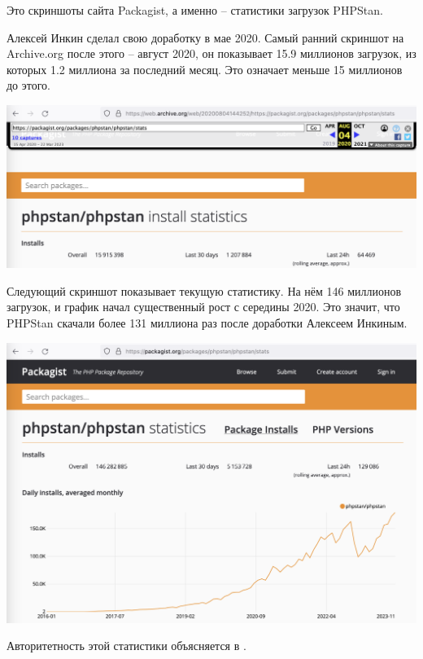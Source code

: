 
Это скриншоты сайта Packagist, а именно -- статистики загрузок PHPStan.

Алексей Инкин сделал свою доработку в мае 2020.
Самый ранний скриншот на Archive.org после этого -- август 2020, он показывает 15.9 миллионов загрузок,
из которых 1.2 миллиона за последний месяц.
Это означает меньше 15 миллионов до этого.

\includegraphics[width=\textwidth]{packagist-stat-2020}

Следующий скриншот показывает текущую статистику.
На нём 146 миллионов загрузок, и график начал существенный рост с середины 2020.
Это значит, что PHPStan скачали более 131 миллиона раз после доработки Алексеем Инкиным.

\includegraphics[width=\textwidth]{packagist-stat}

Авторитетность этой статистики объясняется в .

\pagebreak

